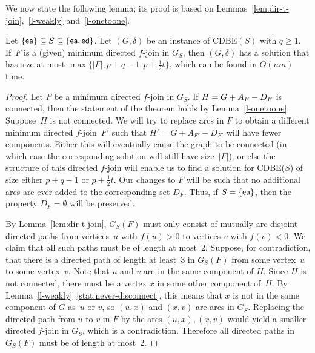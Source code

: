 \documentclass[11pt]{llncs}
\newcommand{\ed}{{\sf ed}}
\newcommand{\ea}{{\sf ea}}
\newcommand{\cdbe}{{\sc CDBE}}
\begin{document}
We now state the following lemma;
its proof is based on Lemmas~\ref{lem:dir-t-join},~\ref{l-weakly} and~\ref{l-onetoone}.

\begin{sloppypar}
\begin{lemma}\label{l-algo}
Let  $\{\ea\}\subseteq S \subseteq \{\ea,\ed\}$.  Let $(G,\delta)$ be an
instance of \cdbe$(S)$ with $q \geq 1$.  If~$F$ is a (given) minimum directed $f$-join in
$G_S$, then $(G,\delta)$ has a solution that has size at most
$\max\{|F|,p+q-1,p+\frac{1}{2}t\}$, which can be found in
$O(nm)$ time.
\end{lemma}
\end{sloppypar}

\begin{proof}
Let $F$ be a minimum directed $f$-join in $G_S$. If $H=G+A_F-\nobreak D_F$ is connected,
then the statement of the theorem holds by Lemma~\ref{l-onetoone}.  Suppose~$H$
is not connected.  We will try to replace arcs in $F$ to obtain a different
minimum directed $f$-join~$F'$ such that $H'=G+A_{F'}-D_{F'}$ will have fewer
components. Either this will eventually cause the graph to be connected (in
which case the corresponding solution will still have size~$|F|$), or else the
structure of this directed $f$-join will enable us to find a solution for
\cdbe($S$) of size either $p+q-1$ or $p+\frac{1}{2}t$. Our changes to $F$ will
be such that no additional arcs are ever added to the corresponding set $D_F$.
Thus, if $S=\{\ea\}$, then the property $D_F=\emptyset$ will be preserved.

By Lemma~\ref{lem:dir-t-join}, $G_S(F)$ must only consist of mutually
arc-disjoint directed paths from vertices~$u$ with $f(u)>0$ to vertices $v$
with $f(v)<0$. We claim that all such paths must be of length at most~2.
Suppose, for contradiction, that there is a directed path of length at least~3
in $G_S(F)$ from some vertex~$u$ to some vertex~$v$. Note that $u$ and $v$ are
in the same component of $H$. Since $H$ is not  connected, there must be a
vertex $x$ in some other component of~$H$. By Lemma~\ref{l-weakly}~\ref{stat:never-disconnect}, this
means that $x$ is not in the same component of $G$ as~$u$ or $v$, so $(u,x)$
and $(x,v)$ are arcs in $G_S$.  Replacing the directed path from $u$ to $v$ in
$F$ by the arcs $(u,x),(x,v)$ would yield a smaller directed $f$-join in $G_S$,
which is a contradiction.  Therefore all directed paths in $G_S(F)$ must be of
length at most~2. 


\end{proof}
\end{document}
